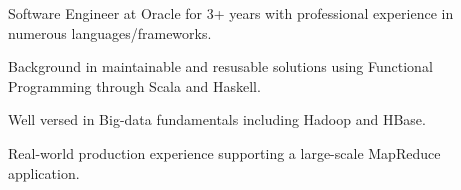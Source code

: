 

\begin{cvparagraph}


Software Engineer at Oracle for 3+ years with professional experience in numerous languages/frameworks.

Background in maintainable and resusable solutions using Functional Programming through Scala and Haskell.

Well versed in Big-data fundamentals including Hadoop and HBase.

Real-world production experience supporting a large-scale MapReduce application.


\end{cvparagraph}
